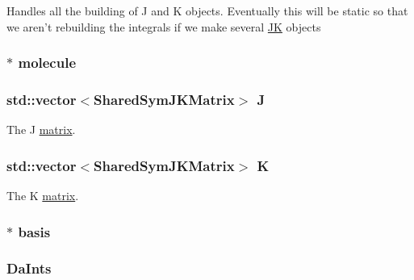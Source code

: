 Handles all the building of J and K objects. Eventually this will be static so that we aren't rebuilding the integrals if we make several \hyperlink{classJKBuilder_1_1JK}{JK} objects \hypertarget{classJKBuilder_1_1JK_ad646bdee4fc9f601f954b4a98c4da476}{
\subsubsection[{molecule}]{$\ast$ {\bf molecule}}}
\label{classJKBuilder_1_1JK_ad646bdee4fc9f601f954b4a98c4da476}
\hypertarget{classJKBuilder_1_1JK_aa04a91cc219b5dabfce19d5316f96887}{
\subsubsection[{J}]{\setlength{\rightskip}{0pt plus 5cm}std::vector$<${\bf SharedSymJKMatrix}$>$ {\bf J}}}
\label{classJKBuilder_1_1JK_aa04a91cc219b5dabfce19d5316f96887}


The J \hyperlink{classJKBuilder_1_1matrix}{matrix}. \hypertarget{classJKBuilder_1_1JK_a5160b673d25f0110d98097f8e7364315}{
\subsubsection[{K}]{\setlength{\rightskip}{0pt plus 5cm}std::vector$<${\bf SharedSymJKMatrix}$>$ {\bf K}}}
\label{classJKBuilder_1_1JK_a5160b673d25f0110d98097f8e7364315}


The K \hyperlink{classJKBuilder_1_1matrix}{matrix}. \hypertarget{classJKBuilder_1_1JK_a81392b84b45d3cf84c5c105e9fd5d09c}{
\subsubsection[{basis}]{$\ast$ {\bf basis}}}
\label{classJKBuilder_1_1JK_a81392b84b45d3cf84c5c105e9fd5d09c}
\hypertarget{classJKBuilder_1_1JK_ad95ede2076c192d856848b3635efc38e}{
\subsubsection[{DaInts}]{ {\bf DaInts}}}
\label{classJKBuilder_1_1JK_ad95ede2076c192d856848b3635efc38e}


